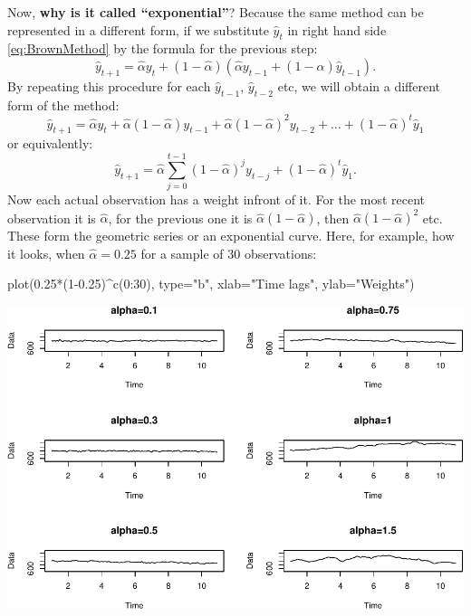 \documentclass[
]{book}
\newenvironment{Shaded}{\begin{snugshade}}{\end{snugshade}}
\newcommand{\AttributeTok}[1]{\textcolor[rgb]{0.77,0.63,0.00}{#1}}
\newcommand{\DecValTok}[1]{\textcolor[rgb]{0.00,0.00,0.81}{#1}}
\newcommand{\FloatTok}[1]{\textcolor[rgb]{0.00,0.00,0.81}{#1}}
\newcommand{\FunctionTok}[1]{\textcolor[rgb]{0.00,0.00,0.00}{#1}}
\newcommand{\NormalTok}[1]{#1}
\newcommand{\SpecialCharTok}[1]{\textcolor[rgb]{0.00,0.00,0.00}{#1}}
\newcommand{\StringTok}[1]{\textcolor[rgb]{0.31,0.60,0.02}{#1}}
\theoremstyle{definition}
\theoremstyle{definition}
\theoremstyle{definition}
\theoremstyle{definition}
\theoremstyle{remark}
\begin{document}
Now, \textbf{why is it called ``exponential''}? Because the same method can be represented in a different form, if we substitute \(\hat{y}_{t}\) in right hand side \eqref{eq:BrownMethod} by the formula for the previous step:
\begin{equation}
  \hat{y}_{t+1} = \hat{\alpha} {y}_{t} + (1 -\hat{\alpha}) \left( \hat{\alpha} {y}_{t-1} + (1 -\hat{\alpha}) \hat{y}_{t-1} \right).
  \label{eq:BrownMethodExponential1}
\end{equation}
By repeating this procedure for each \(\hat{y}_{t-1}\), \(\hat{y}_{t-2}\) etc, we will obtain a different form of the method:
\begin{equation}
  \hat{y}_{t+1} = \hat{\alpha} {y}_{t} + \hat{\alpha} (1 -\hat{\alpha}) {y}_{t-1} + \hat{\alpha} (1 -\hat{\alpha})^2 {y}_{t-2} + \dots + (1 -\hat{\alpha})^t \hat{y}_1 
  \label{eq:BrownMethodExponential2}
\end{equation}
or equivalently:
\begin{equation}
  \hat{y}_{t+1} = \hat{\alpha} \sum_{j=0}^{t-1} (1 -\hat{\alpha})^j {y}_{t-j} + (1 -\hat{\alpha})^t \hat{y}_1 .
  \label{eq:BrownMethodExponential3}
\end{equation}
Now each actual observation has a weight infront of it. For the most recent observation it is \(\hat{\alpha}\), for the previous one it is \(\hat{\alpha} (1 -\hat{\alpha})\), then \(\hat{\alpha} (1 -\hat{\alpha})^2\) etc. These form the geometric series or an exponential curve. Here, for example, how it looks, when \(\hat{\alpha} =0.25\) for a sample of 30 observations:

\begin{Shaded}
\begin{Highlighting}[]
\FunctionTok{plot}\NormalTok{(}\FloatTok{0.25}\SpecialCharTok{*}\NormalTok{(}\DecValTok{1}\FloatTok{{-}0.25}\NormalTok{)}\SpecialCharTok{\^{}}\FunctionTok{c}\NormalTok{(}\DecValTok{0}\SpecialCharTok{:}\DecValTok{30}\NormalTok{), }\AttributeTok{type=}\StringTok{"b"}\NormalTok{, }
     \AttributeTok{xlab=}\StringTok{"Time lags"}\NormalTok{, }\AttributeTok{ylab=}\StringTok{"Weights"}\NormalTok{)}
\end{Highlighting}
\end{Shaded}

\includegraphics{adam_files/figure-latex/unnamed-chunk-22-1.pdf}
\end{document}
